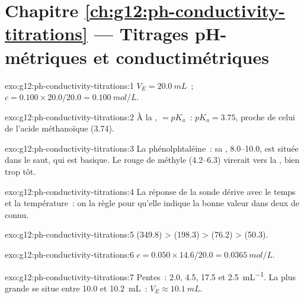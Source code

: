 \section*{Chapitre \ref{ch:g12:ph-conductivity-titrations} --- Titrages pH-métriques et conductimétriques}

\begin{solution}{exo:g12:ph-conductivity-titrations:1}
$V_E = \qty{20.0}{mL}$~; $c = 0.100 \times 20.0 / 20.0 = \qty{0.100}{mol/L}$.
\end{solution}

\begin{solution}{exo:g12:ph-conductivity-titrations:2}
À la ,  $= pK_a$~: $pK_a = 3.75$, proche de celui de
l'acide méthanoïque
(3.74).
\end{solution}

\begin{solution}{exo:g12:ph-conductivity-titrations:3}
La phénolphtaléine~: sa , 8.0--10.0, est située dans le
saut, qui est basique. Le rouge de méthyle (4.2--6.3) virerait vers la
, bien trop tôt.
\end{solution}

\begin{solution}{exo:g12:ph-conductivity-titrations:4}
La réponse de la sonde dérive avec le temps et la température~: on la
règle pour qu'elle indique la bonne valeur dans deux 
de  connu.
\end{solution}

\begin{solution}{exo:g12:ph-conductivity-titrations:5}
 (349.8) >  (198.3) >  (76.2) >  (50.3).
\end{solution}

\begin{solution}{exo:g12:ph-conductivity-titrations:6}
$c = 0.050 \times 14.6 / 20.0 = \qty{0.0365}{mol/L}$.
\end{solution}

\begin{solution}{exo:g12:ph-conductivity-titrations:7}
Pentes~: 2.0, 4.5, 17.5 et \qty{2.5}{mL^{-1}}. La plus grande se situe
entre
10.0 et \qty{10.2}{mL}~: $V_E \approx \qty{10.1}{mL}$.
\end{solution}

